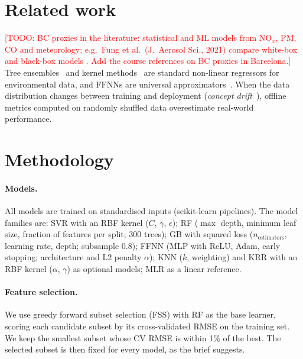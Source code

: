 \documentclass[11pt,a4paper]{article}
\newcommand{\todo}[1]{\textcolor{red}{[TODO: #1]}}
\begin{document}
\section{Related work}
\todo{BC proxies in the literature: statistical and ML models from NO$_x$, PM, CO and meteorology; e.g.\ Fung et al.\ (J.\ Aerosol Sci., 2021) compare white-box and black-box models \cite{fung2021}. Add the course references on BC proxies in Barcelona.}
Tree ensembles~\cite{breiman2001,friedman2001} and kernel methods~\cite{drucker1997} are standard non-linear regressors for environmental data, and FFNNs are universal approximators~\cite{hornik1989}. When the data distribution changes between training and deployment (\emph{concept drift}~\cite{gama2014}), offline metrics computed on randomly shuffled data overestimate real-world performance.

\section{Methodology}
\paragraph{Models.} All models are trained on standardised inputs (scikit-learn pipelines). The model families are:
SVR with an RBF kernel ($C$, $\gamma$, $\epsilon$);
RF ($\max$ depth, minimum leaf size, fraction of features per split; 300 trees);
GB with squared loss ($n_{\text{estimators}}$, learning rate, depth; subsample 0.8);
FFNN (MLP with ReLU, Adam, early stopping; architecture and L2 penalty $\alpha$);
KNN ($k$, weighting) and KRR with an RBF kernel ($\alpha$, $\gamma$) as optional models;
MLR as a linear reference.

\paragraph{Feature selection.} We use greedy forward subset selection (FSS) with RF as the base learner, scoring each candidate subset by its cross-validated RMSE on the training set. We keep the smallest subset whose CV RMSE is within 1\% of the best. The selected subset is then fixed for every model, as the brief suggests.
\end{document}
